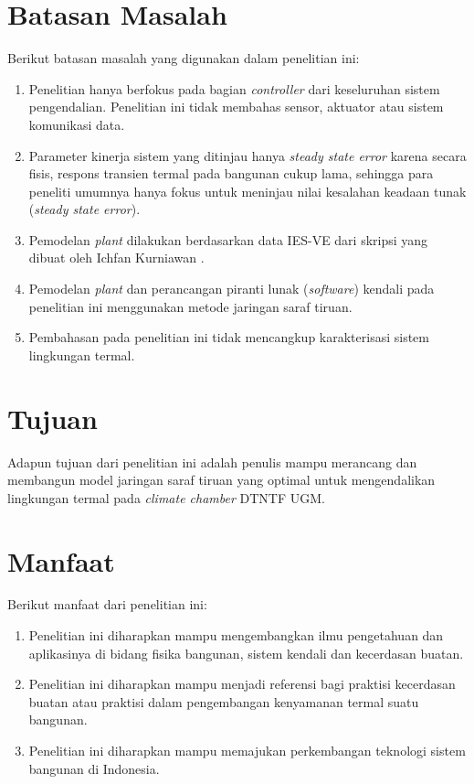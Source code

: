 \section{Batasan Masalah}
Berikut batasan masalah yang digunakan dalam penelitian ini:
\begin{enumerate}
	\item Penelitian hanya berfokus pada bagian \textit{controller} dari keseluruhan sistem pengendalian. Penelitian ini tidak membahas sensor, aktuator atau sistem komunikasi data.
	\item Parameter kinerja sistem yang ditinjau hanya \textit{steady state error} karena secara fisis, respons transien termal pada bangunan cukup lama, sehingga para peneliti umumnya hanya fokus untuk meninjau nilai kesalahan keadaan tunak (\textit{steady state error}).
	\item Pemodelan \textit{plant} dilakukan berdasarkan data IES-VE dari skripsi yang dibuat oleh Ichfan Kurniawan \cite{skripsi1}.
	\item Pemodelan \textit{plant} dan perancangan piranti lunak (\textit{software}) kendali pada penelitian ini menggunakan metode jaringan saraf tiruan.
	\item Pembahasan pada penelitian ini tidak mencangkup karakterisasi sistem lingkungan termal.
\end{enumerate}

\section{Tujuan}
Adapun tujuan dari penelitian ini adalah penulis mampu merancang dan membangun model jaringan saraf tiruan yang optimal untuk mengendalikan lingkungan termal pada \textit{climate chamber} DTNTF UGM.

\section{Manfaat}
Berikut manfaat dari penelitian ini:
\begin{enumerate}
	\item Penelitian ini diharapkan mampu mengembangkan ilmu pengetahuan dan aplikasinya di bidang fisika bangunan, sistem kendali dan kecerdasan buatan.
	\item Penelitian ini diharapkan mampu menjadi referensi bagi praktisi kecerdasan buatan atau praktisi dalam pengembangan kenyamanan termal suatu bangunan.
	\item Penelitian ini diharapkan mampu memajukan perkembangan teknologi sistem bangunan di Indonesia.
\end{enumerate}



